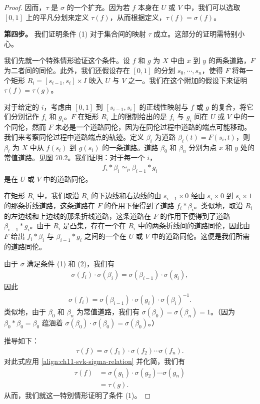 \documentclass[../../main.tex]{subfiles}
\begin{document}
\begin{proof}
因而，$\tau$ 是 $\sigma$ 的一个扩充。因为若 $f$ 本身在 $U$ 或 $V$ 中，我们可以选取 $[0,1]$ 上的平凡分划来定义 $\tau(f)$，从而根据定义，$\tau(f)=\sigma(f)$。

\textbf{第四步。} 我们证明条件 (1) 对于集合间的映射 $\tau$ 成立。这部分的证明需特别小心。

我们先就一个特殊情形验证这个条件。设 $f$ 和 $g$ 为 $X$ 中由 $x$ 到 $y$ 的两条道路，$F$ 为二者间的同伦。此外，我们还假设存在 $[0,1]$ 的分划 $s_0,\cdots,s_n$，使得 $F$ 将每一个矩形 $R_i=[s_{i-1},s_i]\times I$ 映入 $U$ 与 $V$ 之一。我们在这个附加的假设下来证明 $\tau(f)=\tau(g)$。

对于给定的 $i$，考虑由 $[0,1]$ 到 $[s_{i-1},s_i]$ 的正线性映射与 $f$ 或 $g$ 的复合，将它们分别记作 $f_i$ 和 $g_i$。$F$ 在矩形 $R_i$ 上的限制给出的是 $f_i$ 与 $g_i$ 间在 $U$ 或 $V$ 中的一个同伦，然而 $F$ 未必是一个道路同伦，因为在同伦过程中道路的端点可能移动。我们来考察同伦过程中道路端点的轨迹。定义 $\beta_i$ 为道路 $\beta_i(t)=F(s_i,t)$，则 $\beta_i$ 为 $X$ 中从 $f(s_i)$ 到 $g(s_i)$ 的一条道路。道路 $\beta_0$ 和 $\beta_n$ 分别为点 $x$ 和 $y$ 处的常值道路。见图 70.2。我们证明：对于每一个 $i$，
\begin{align*}
f_i*\beta_i\simeq_p\beta_{i-1}*g_i
\end{align*}
是在 $U$ 或 $V$ 中的道路同伦。


在矩形 $R_i$ 中，我们取沿 $R_i$ 的下边线和右边线的由 $s_{i-1}\times 0$ 经由 $s_i\times 0$ 到 $s_i\times 1$ 的那条折线道路，这条道路在 $F$ 的作用下便得到了道路 $f_i*\beta_i$。类似地，取沿 $R_i$ 的左边线和上边线的那条折线道路，这条道路在 $F$ 的作用下便得到了道路 $\beta_{i-1}*g_i$。由于 $R_i$ 是凸集，存在一个在 $R_i$ 中的两条折线间的道路同伦，因此由 $F$ 给出 $f_i*\beta_i$ 与 $\beta_{i-1}*g_i$ 之间的一个在 $U$ 或 $V$ 中的道路同伦。这便是我们所需的道路同伦。

由于 $\sigma$ 满足条件 (1) 和 (2)，我们有
\begin{align*}
\sigma(f_i)\cdot\sigma(\beta_i)=\sigma(\beta_{i-1})\cdot\sigma(g_i),
\end{align*}
因此
\begin{align}
\sigma(f_i)=\sigma(\beta_{i-1})\cdot\sigma(g_i)\cdot\sigma(\beta_i)^{-1}.\label{align:ch11-svk-sigma-relation}
\end{align}
类似地，由于 $\beta_0$ 和 $\beta_n$ 为常值道路，我们有 $\sigma(\beta_0)=\sigma(\beta_n)=1$。（因为 $\beta_0*\beta_0=\beta_0$ 蕴涵着 $\sigma(\beta_0)\cdot\sigma(\beta_0)=\sigma(\beta_0)$。）

推导如下：
\begin{align*}
\tau(f)=\sigma(f_1)\cdot\sigma(f_2)\cdots\sigma(f_n).
\end{align*}
对此式应用 \eqref{align:ch11-svk-sigma-relation} 并化简，我们有
\begin{align*}
\tau(f)&=\sigma(g_1)\cdot\sigma(g_2)\cdots\sigma(g_n)\\
&=\tau(g).
\end{align*}
从而，我们就这一特别情形证明了条件 (1)。


\end{proof}
\end{document}
